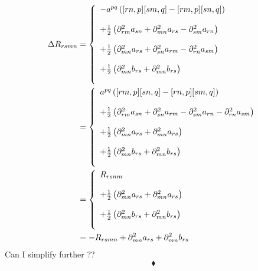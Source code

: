 \begin{align}
\Delta R_{rsmn}&= \left\{\begin{array}{l}-a^{pq}\left([rn,p][sm,q] - [rm,p][sn,q]\right)\\\\
  +\frac{1}{2}\left(\partial^2_{rm} a_{sn} + \partial^2_{mn} a_{rs}-\partial^2_{sm} a_{rn}\right)\\\\ 
+\frac{1}{2}\left(\partial^2_{mn} a_{rs} + \partial^2_{sn} a_{rm}-\partial^2_{rn} a_{sm}\right)\\\\  
+\frac{1}{2}\left( \partial^2_{mn} b_{rs}+\partial^2_{mn} b_{rs}\right)\\\\
  \end{array}\right.\\
  &= \left\{\begin{array}{l}a^{pq}\left( [rm,p][sn,q]-[rn,p][sm,q]\right)\\\\
  +\frac{1}{2}\left(\partial^2_{rm} a_{sn} + \partial^2_{sn} a_{rm} -\partial^2_{sm} a_{rn}-\partial^2_{rn} a_{sm}\right)\\\\  
  +\frac{1}{2}\left(\partial^2_{mn} a_{rs}+\partial^2_{mn} a_{rs}\right)\\\\
+\frac{1}{2}\left( \partial^2_{mn} b_{rs}+\partial^2_{mn} b_{rs}\right)\\\\
  \end{array}\right.\\
  &= \left\{\begin{array}{l}R_{rsnm}\\\\  
  +\frac{1}{2}\left(\partial^2_{mn} a_{rs}+\partial^2_{mn} a_{rs}\right)\\\\
+\frac{1}{2}\left( \partial^2_{mn} b_{rs}+\partial^2_{mn} b_{rs}\right)\\\\
  \end{array}\right.\\
    &= -R_{rsmn}
  +\partial^2_{mn} a_{rs}+\partial^2_{mn} b_{rs}
\end{align}
Can I simplify further ??
$$\blacklozenge$$
\newpage


